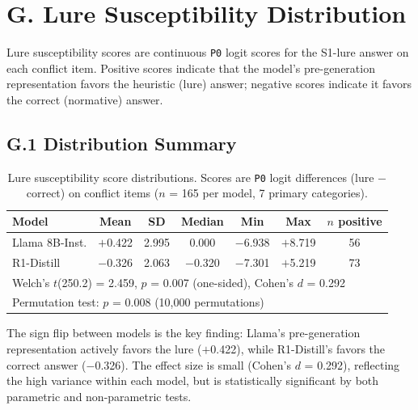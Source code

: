 \documentclass{article}
\newcommand{\pzero}{\texttt{P0}}
\begin{document}

\section*{G. Lure Susceptibility Distribution}
\label{sec:appendix_lure}

Lure susceptibility scores are continuous \pzero{} logit scores for
the S1-lure answer on each conflict item.  Positive scores indicate
that the model's pre-generation representation favors the heuristic
(lure) answer; negative scores indicate it favors the correct
(normative) answer.

\subsection*{G.1 Distribution Summary}

\begin{table}[ht]
\centering
\caption{Lure susceptibility score distributions.  Scores are
  \pzero{} logit differences (lure $-$ correct) on conflict items
  ($n$ = 165 per model, 7 primary categories).}
\label{tab:lure_dist}
\vspace{4pt}
\small
\begin{tabular}{lcccccc}
\toprule
\textbf{Model} & \textbf{Mean} & \textbf{SD} & \textbf{Median} &
  \textbf{Min} & \textbf{Max} & \textbf{$n$ positive} \\
\midrule
Llama 8B-Inst.   & $+$0.422 & 2.995 & 0.000 & $-$6.938 & $+$8.719 & 56 \\
R1-Distill       & $-$0.326 & 2.063 & $-$0.320 & $-$7.301 & $+$5.219 & 73 \\
\midrule
\multicolumn{7}{l}{Welch's $t$(250.2) = 2.459, $p$ = 0.007 (one-sided), Cohen's $d$ = 0.292} \\
\multicolumn{7}{l}{Permutation test: $p$ = 0.008 (10{,}000 permutations)} \\
\bottomrule
\end{tabular}
\end{table}

\noindent The sign flip between models is the key finding: Llama's
pre-generation representation actively favors the lure ($+$0.422),
while R1-Distill's favors the correct answer ($-$0.326).  The effect
size is small (Cohen's $d$ = 0.292), reflecting the high variance
within each model, but is statistically significant by both
parametric and non-parametric tests.
\end{document}
